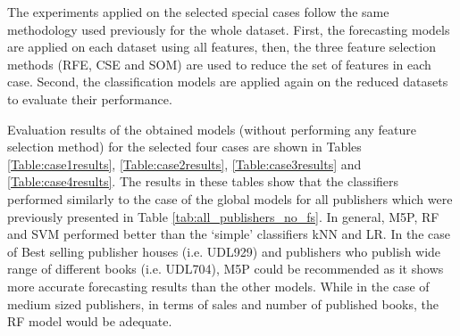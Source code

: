 \documentclass[a4paper,10pt,twocolumn,preprint,3p]{elsarticle}
\begin{document}
The experiments applied on the selected special cases follow the same methodology used previously for the whole dataset. First, the forecasting models are applied on each dataset using all features, then, the three feature selection methods (RFE, CSE and SOM) are used to reduce the set of features in each case. Second, the classification models are applied again on the reduced datasets to evaluate their performance.

Evaluation results of the obtained models (without performing any feature selection method) for the selected four cases are shown in Tables \ref{Table:case1results}, \ref{Table:case2results}, \ref{Table:case3results} and \ref{Table:case4results}. The results in these tables show that the classifiers performed similarly to the case of the global models for all publishers which were previously presented in Table \ref{tab:all_publishers_no_fs}. In general, M5P, RF and SVM performed better than the `simple' classifiers kNN and LR. In the case of Best selling publisher houses (i.e. UDL929) and publishers who publish wide range of different books (i.e. UDL704), M5P could be recommended as it shows more accurate forecasting results than the other models. While in the case of medium sized publishers, in terms of sales and number of published books, the RF model would be adequate.


\begin{table*}
\caption{Predicting Total sales for publishing company-UDL929 (The best selling publishing company). Best values in bold. }
\centering{}%
\label{Table:case1results}
\end{table*}
\end{document}
